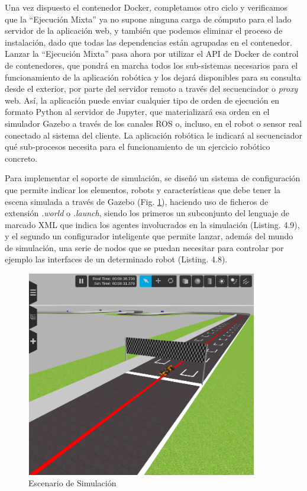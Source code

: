 Una vez dispuesto el contenedor Docker, completamos otro ciclo y verificamos que la ``Ejecución Mixta'' ya no supone ninguna carga de cómputo para el lado servidor de la aplicación web, y también que podemos eliminar el proceso de instalación, dado que todas las dependencias están agrupadas en el contenedor. Lanzar la ``Ejecución Mixta'' pasa ahora por utilizar el API de Docker de control de contenedores, que pondrá en marcha todos los sub-sistemas necesarios para el funcionamiento de la aplicación robótica y los dejará disponibles para su consulta desde el exterior, por parte del servidor remoto a través del secuenciador o \textit{proxy} web. Así, la aplicación puede enviar cualquier tipo de orden de ejecución en formato Python al servidor de Jupyter, que materializará esa orden en el simulador Gazebo a través de los canales ROS o, incluso, en el robot o sensor real conectado al sistema del cliente. La aplicación robótica le indicará al secuenciador qué sub-procesos necesita para el funcionamiento de un ejercicio robótico concreto.

Para implementar el soporte de simulación, se diseñó un sistema de configuración que permite indicar los elementos, robots y características que debe tener la escena simulada a través de Gazebo (Fig. \ref{gzworld}), haciendo uso de ficheros de extensión \textit{.world} o \textit{.launch}, siendo los primeros un subconjunto del lenguaje de marcado XML que indica los agentes involucrados en la simulación (Listing. 4.9), y el segundo un configurador inteligente que permite lanzar, además del mundo de simulación, una serie de nodos que se puedan necesitar para controlar por ejemplo las interfaces de un determinado robot (Listing. 4.8). 


\begin{figure}[!hbtp]  \centering\noindent
    \includegraphics[width=0.9\textwidth]{figures/world_gazebo.png}
    \caption{Escenario de Simulación}
    \label{gzworld}
\end{figure}

